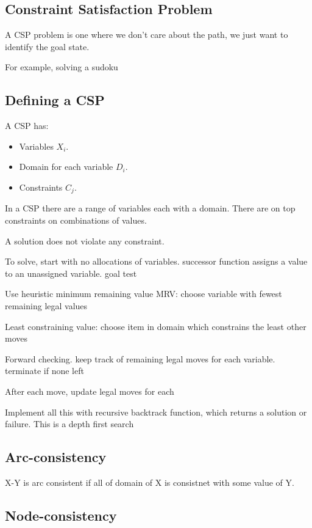
\subsection{Constraint Satisfaction Problem}

A CSP problem is one where we don't care about the path, we just want to identify the goal state.

For example, solving a sudoku

\subsection{Defining a CSP}

A CSP has:

\begin{itemize}
\item Variables \(X_i\).
\item Domain for each variable \(D_i\).
\item Constraints \(C_j\).
\end{itemize}

In a CSP there are a range of variables each with a domain. There are on top constraints on combinations of values.

A solution does not violate any constraint.

To solve, start with no allocations of variables. successor function assigns a value to an unassigned variable. goal test

Use heuristic minimum remaining value MRV: choose variable with fewest remaining legal values

Least constraining value: choose item in domain which constrains the least other moves

Forward checking. keep track of remaining legal moves for each variable. terminate if none left

After each move, update legal moves for each

Implement all this with recursive backtrack function, which returns a solution or failure. This is a depth first search

\subsection{Arc-consistency}

X-Y is arc consistent if all of domain of X is consistnet with some value of Y.

\subsection{Node-consistency}

